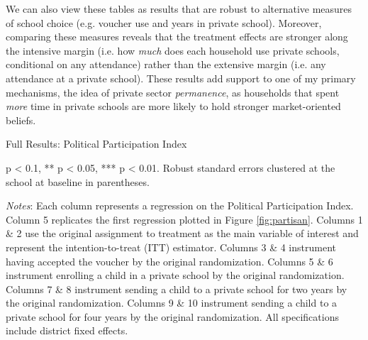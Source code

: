 \documentclass[hidelinks, 12pt, titlepage]{article}
\begin{document}
			We can also view these tables as results that are robust to alternative measures of school choice (e.g. voucher use and years in private school).  Moreover, comparing these measures reveals that the treatment effects are stronger along the intensive margin (i.e. how \emph{much} does each household use private schools, conditional on any attendance) rather than the extensive margin (i.e. any attendance at a private school).  These results add support to one of my primary mechanisms, the idea of private sector \emph{permanence}, as households that spent \emph{more} time in private schools are more likely to hold stronger market-oriented beliefs.

			\clearpage

				\begin{landscape}

					\begin{table}
						\begin{threeparttable}
							\centering
							\caption{Full Results: Political Participation Index\label{table:appendixpolpart}}
							
							\begin{tablenotes}
								\item * p < 0.1, ** p < 0.05, *** p < 0.01. Robust standard errors clustered at the school at baseline in parentheses.
								\item \emph{Notes}: Each column represents a regression on the Political Participation Index.  Column 5 replicates the first regression plotted in Figure \ref{fig:partisan}.  Columns 1 \& 2 use the original assignment to treatment as the main variable of interest and represent the intention-to-treat (ITT) estimator.  Columns 3 \& 4 instrument having accepted the voucher by the original randomization.  Columns 5 \& 6 instrument enrolling a child in a private school by the original randomization.  Columns 7 \& 8 instrument sending a child to a private school for two years by the original randomization.  Columns 9 \& 10 instrument sending a child to a private school for four years by the original randomization.  All specifications include district fixed effects.
							\end{tablenotes}
						\end{threeparttable}
					\end{table}


\end{landscape}
\end{document}
